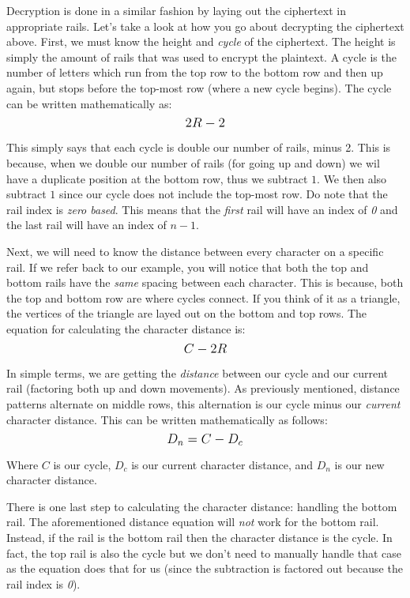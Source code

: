 Decryption is done in a similar fashion by laying out the ciphertext in appropriate rails. Let's take a look at how
you go about decrypting the ciphertext above. First, we must know the height and \textit{cycle} of the ciphertext. The height
is simply the amount of rails that was used to encrypt the plaintext. A cycle is the number of letters which run from the top 
row to the bottom row and then up again, but stops before the top-most row (where a new cycle begins). The cycle can be 
written mathematically as: $$\mathlarger{2R - 2}$$ 

This simply says that each cycle is double our number of rails, minus 2. This is because, when we double our number of rails
(for going up and down) we wil have a duplicate position at the bottom row, thus we subtract $1$. We then also 
subtract $1$ since our cycle does not include the top-most row. Do note that the rail index is \textit{zero based}. This means
that the \textit{first} rail will have an index of \textit{0} and the last rail will have an index of $n - 1$.

Next, we will need to know the distance between every character on a specific rail. If we refer back to our example,
you will notice that both the top and bottom rails have the \textit{same} spacing between each character. This is because,
both the top and bottom row are where cycles connect. If you think of it as a triangle, the vertices of the triangle are
layed out on the bottom and top rows. The equation for calculating the character distance is: $$\mathlarger{C - 2R}$$

In simple terms, we are getting the \textit{distance} between our cycle and our current rail (factoring both up and
 down movements). As previously mentioned, distance patterns alternate on middle rows, this alternation is our cycle
  minus our \textit{current} character distance. This can be written mathematically as follows: $$\mathlarger{D_n = C - D_c}$$

Where $C$ is our cycle, $D_c$ is our current character distance, and $D_n$ is our new character distance.

There is one last step to calculating the character distance: handling the bottom rail. The aforementioned distance equation
will \textit{not} work for the bottom rail. Instead, if the rail is the bottom rail then the character distance is the 
cycle. In fact, the top rail is also the cycle but we don't need to manually handle that case as the equation does that for us
(since the subtraction is factored out because the rail index is \textit{0}).

